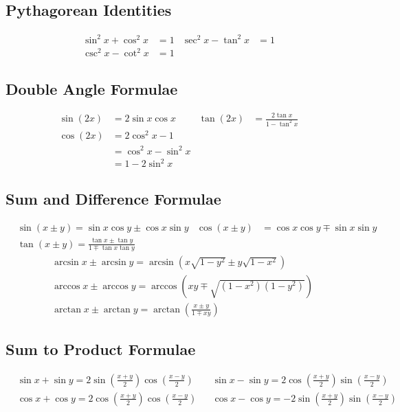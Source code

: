 \subsection{Pythagorean Identities}
\begin{align*}
	\sin^2x + \cos^2x &= 1 &  \sec^2 x - \tan^2x &= 1 \\
	 \csc^2 x - \cot^2 x &= 1
\end{align*}

\subsection{Double Angle Formulae}
\begin{align*}
\sin{(2x)} &= 2\sin x\cos x & \tan{(2x)} &= \frac{2\tan x}{1 - \tan^2x} \\
\cos{(2x)} &= 2\cos^2x - 1 \\
&= \cos^2x - \sin^2x \\ &= 1 - 2\sin^2x
\end{align*}

\subsection{Sum and Difference Formulae}
\begin{align*}
&\sin{(x \pm y)} = \sin x\cos y \pm \cos x\sin y &
\cos{(x \pm y)} &= \cos x \cos y \mp \sin x \sin y \\
&\tan{(x \pm y)} = \frac{\tan x \pm \tan y}{1 \mp \tan x \tan y}
\end{align*}
\begin{align*}
&\arcsin x \pm \arcsin y = \arcsin{(x\sqrt{1 - y^2}\pm y\sqrt{1 - x^2})} \\ &\arccos x \pm \arccos y = \arccos{(xy \mp \sqrt{(1-x^2)(1-y^2)})} \\
&\arctan x \pm \arctan y = \arctan{(\frac{x\pm y}{1 \mp xy})}
\end{align*}

\subsection{Sum to Product Formulae}
\begin{align*}
&\sin x + \sin y = 2\sin{\left(\frac{x+y}{2}\right)}\cos{\left(\frac{x-y}{2}\right)} & &\sin x - \sin y = 2\cos{\left(\frac{x+y}{2}\right)}\sin{\left(\frac{x-y}{2}\right)} \\
&\cos x + \cos y = 2\cos{\left(\frac{x+y}{2}\right)}\cos{\left(\frac{x-y}{2}\right)} &
&\cos x - \cos y = -2\sin{\left(\frac{x+y}{2}\right)}\sin{\left(\frac{x-y}{2}\right)}
\end{align*}
